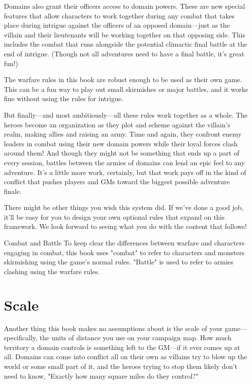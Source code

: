 \documentclass[10pt,a4paper,twoside,bg=print,twocolumn,openany,nodeprecatedcode]{dndbook}
\begin{document}
Domains also grant their officers access to domain powers. These are new special features that allow characters to work together during any combat that takes place during intrigue against the officers of an opposed domain—just as the villain and their lieutenants will be working together on that opposing side. This includes the combat that runs alongside the potential climactic final battle at the end of intrigue. (Though not all adventures need to have a final battle, it's great fun!)

The warfare rules in this book are robust enough to be used as their own game. This can be a fun way to play out small skirmishes or major battles, and it works fine without using the rules for intrigue.

But finally—and most ambitiously—all these rules work together as a whole. The heroes become an organization as they plot and scheme against the villain's realm, making allies and raising an army. Time and again, they confront enemy leaders in combat using their new domain powers while their loyal forces clash around them! And though they might not be something that ends up a part of every session, battles between the armies of domains can lend an epic feel to any adventure. It's a little more work, certainly, but that work pays off in the kind of conflict that pushes players and GMs toward the biggest possible adventure finale.

There might be other things you wish this system did. If we've done a good job, it'll be easy for you to design your own optional rules that expand on this framework. We look forward to seeing what you do with the content that follows!

\begin{DndSidebar}[float=!b]{Combat and Battle}
To keep clear the differences between warfare and characters engaging in combat, this book uses "combat" to refer to characters and monsters skirmishing using the game's normal rules. "Battle" is used to refer to armies clashing using the warfare rules.



\end{DndSidebar}

\section{Scale}
Another thing this book makes no assumptions about is the scale of your game—specifically, the units of distance you use on your campaign map. How much territory a domain controls is something left to the GM—if it ever comes up at all. Domains can come into conflict all on their own as villains try to blow up the world or some small part of it, and the heroes trying to stop them likely don't need to know, "Exactly how many square miles do they control?"
\end{document}
